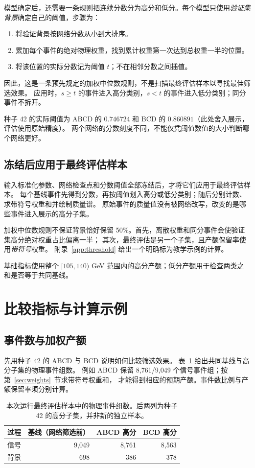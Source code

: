 \documentclass[11pt,a4paper,fontset=fandol,scheme=plain]{ctexart}
\begin{document}
模型确定后，还需要一条规则把连续分数分为高分和低分。每个模型只使用\emph{验证集背景}确定自己的阈值，步骤为：
\begin{enumerate}[leftmargin=1.7em,itemsep=2pt,topsep=3pt]
\item 将验证背景按网络分数从小到大排序。
\item 累加每个事件的绝对物理权重，找到累计权重第一次达到总权重一半的位置。
\item 将该位置的实际分数记为阈值 $t$；不在相邻分数之间插值。
\end{enumerate}
因此，这是一条预先规定的加权中位数规则，不是扫描最终评估样本以寻找最佳筛选效果。
应用时，$s\geq t$ 的事件进入高分类别，$s<t$ 的事件进入低分类别；同分事件不拆开。

种子 42 的实际阈值为 ABCD 的 $0.746724$ 和 BCD 的 $0.860891$（此处舍入展示，评估使用原始精度）。
两个网络的分数刻度不同，不能仅凭阈值数值的大小判断哪个网络更好。

\subsection{冻结后应用于最终评估样本}

输入标准化参数、网络检查点和分数阈值全部冻结后，才将它们应用于最终评估样本。
每个基线事件先得到分数，再按阈值划入高分或低分类别；随后分别计数、求带符号权重和并绘制质量谱。
原始事件的质量值没有被网络改写，改变的是哪些事件进入展示的高分子集。

加权中位数规则不保证背景恰好保留 50\%。首先，离散权重和同分事件会使验证集高分绝对权重占比偏离一半；
其次，最终评估是另一个子集，且产额保留率使用\emph{带符号}权重。
附录~\ref{app:threshold} 给出一个明确标为教学示例的计算。

基础指标使用整个 $[105,140)$ GeV 范围内的高分产额；低分产额用于检查两类之和是否等于共同基线。

\clearpage
\section{比较指标与计算示例}\label{sec:basic}

\subsection{事件数与加权产额}
先用种子 42 的 ABCD 与 BCD 说明如何比较筛选效果。
表~\ref{tab:groups} 给出共同基线与高分子集的物理事件组数。
例如 ABCD 保留 8,761/9,049 个信号事件组；按第~\ref{sec:weights}~节求带符号权重和，
才能得到相应的预期产额。事件数比例与产额保留率须分别计算。
\begin{table}[H]
\caption{本次运行最终评估样本中的物理事件组数。后两列为种子 42 的高分子集，并非新的独立样本。}
\label{tab:groups}
\centering
\begin{tabular}{lrrr}
\toprule
过程 & 基线（网络筛选前） & ABCD 高分 & BCD 高分 \\
\midrule
信号 & 9,049 & 8,761 & 8,563 \\
背景 & 698 & 386 & 378 \\
\bottomrule
\end{tabular}
\end{table}
\end{document}
